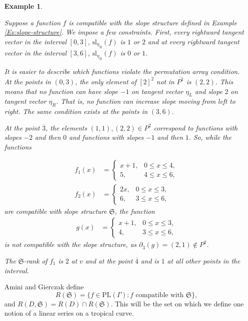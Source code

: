 \documentclass{amsart}
\newtheorem{varexample}[theorem]{Example}
\newenvironment{example}{\begin{varexample}
		\begin{normalfont}}{\end{normalfont}
\end{varexample}}
\begin{document}
	\begin{example}
		\label{Ex:compatibility}
		Suppose a function $f$ is compatible with the slope structure defined in Example \ref{Ex:slope-structure}. We impose a few constraints. First, every rightward tangent vector in the interval $[0,3]$, $\mathrm{sl}_{\eta_R}(f)$ is $1$ or $2$ and at every rightward tangent vector in the interval $[3,6]$, $\mathrm{sl}_{\eta_R}(f)$ is $0$ or $1$.
		
		It is easier to describe which functions violate the permutation array condition. At the points in $(0,3)$, the only element of $[2]^2$ not in $\overline{P^1}$ is $(2,2)$. This means that no function can have slope $-1$ on tangent vector $\eta_L$ and slope $2$ on tangent vector $\eta_R$. That is, no function can increase slope moving from left to right. The same condition exists at the points in $(3,6)$.
		
		At the point $\overline{3}$, the elements $(1,1), (2,2) \in P^2$ correspond to functions with slopes $-2$ and then $0$ and functions with slopes $-1$ and then $1$. So, while the functions
		
		\[
		\begin{aligned}
			f_1(x) &=
			\begin{cases}
				x+1, & 0\le x\le 4,\\
				5, & 4\le x\le 6,
			\end{cases}
			\\[1.5em]
			f_2(x) &=
			\begin{cases}
				2x, & 0\le x\le 3,\\
				6, & 3\le x\le 6,
			\end{cases}
		\end{aligned}
		\] 
		are compatible with slope structure $\mathfrak{S}$, the function 
		\[
		\begin{aligned}
			g(x) &=
			\begin{cases}
				x+1, & 0\le x\le 3,\\
				4, & 3\le x\le 6,
			\end{cases}
		\end{aligned}
		\] 
		is not compatible with the slope structure, as $\partial_{\overline{3}}(g) = (2,1) \not \in P^2$.
		
		The $\mathfrak{S}$-rank of $f_1$ is $2$ at $v$ and at the point $\overline{4}$ and is $1$ at all other points in the interval.
	\end{example}
	
	Amini and Gierczak define $$R(\mathfrak{S}) = \{ f \in \mathrm{PL}(\Gamma) : f \text{ compatible with } \mathfrak{S} \},$$ and $R(D, \mathfrak{S}) = R(D) \cap R(\mathfrak{S})$. This will be the set on which we define one notion of a linear series on a tropical curve.
	
\end{document}
